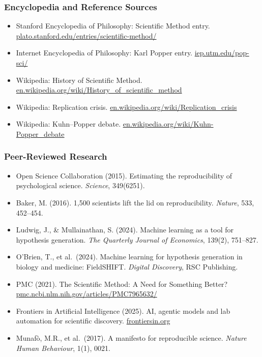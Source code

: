 \documentclass[11pt,letterpaper]{article}
\begin{document}
\subsubsection{Encyclopedia and Reference Sources}
\begin{itemize}[leftmargin=1.5em]
  \item Stanford Encyclopedia of Philosophy: Scientific Method entry. \url{plato.stanford.edu/entries/scientific-method/}
  \item Internet Encyclopedia of Philosophy: Karl Popper entry. \url{iep.utm.edu/pop-sci/}
  \item Wikipedia: History of Scientific Method. \url{en.wikipedia.org/wiki/History_of_scientific_method}
  \item Wikipedia: Replication crisis. \url{en.wikipedia.org/wiki/Replication_crisis}
  \item Wikipedia: Kuhn--Popper debate. \url{en.wikipedia.org/wiki/Kuhn-Popper_debate}
\end{itemize}

\subsubsection{Peer-Reviewed Research}
\begin{itemize}[leftmargin=1.5em]
  \item Open Science Collaboration (2015). Estimating the reproducibility of psychological science. \emph{Science}, 349(6251).
  \item Baker, M. (2016). 1,500 scientists lift the lid on reproducibility. \emph{Nature}, 533, 452--454.
  \item Ludwig, J., \& Mullainathan, S. (2024). Machine learning as a tool for hypothesis generation. \emph{The Quarterly Journal of Economics}, 139(2), 751--827.
  \item O'Brien, T., et al.\ (2024). Machine learning for hypothesis generation in biology and medicine: FieldSHIFT. \emph{Digital Discovery}, RSC Publishing.
  \item PMC (2021). The Scientific Method: A Need for Something Better? \url{pmc.ncbi.nlm.nih.gov/articles/PMC7965632/}
  \item Frontiers in Artificial Intelligence (2025). AI, agentic models and lab automation for scientific discovery. \url{frontiersin.org}
  \item Munafò, M.R., et al.\ (2017). A manifesto for reproducible science. \emph{Nature Human Behaviour}, 1(1), 0021.
\end{itemize}
\end{document}
